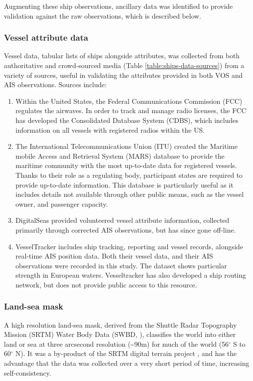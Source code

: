 \documentclass[12pt,letterpaper]{article}
\begin{document}
Augmenting these ship observations, ancillary data was identified to provide validation against the raw observations, which is described below.

\subsubsection{Vessel attribute data}
Vessel data, tabular lists of ships alongside attributes, was collected from both authoritative and crowd-sourced media (Table \ref{table:ships-data-sources}) from a variety of sources, useful in validating the attributes provided in both VOS and AIS observations. Sources include:
\begin{enumerate}
  \item Within the United States, the Federal Communications Commission (FCC) regulates the airwaves. In order to track and manage radio licenses, the FCC has developed the Consolidated Database System (CDBS), which includes information on all vessels with registered radios within the US. 
  \item The International Telecommunications Union (ITU) created the Maritime mobile Access and Retrieval System (MARS) database to provide the maritime community with the most up-to-date data for registered vessels. Thanks to their role as a regulating body, participant states are required to provide up-to-date information. This database is particularly useful as it includes details not available through other public means, such as the vessel owner, and passenger capacity.
  \item DigitalSeas provided volunteered vessel attribute information, collected primarily through corrected AIS observations, but has since gone off-line.
  \item VesselTracker includes ship tracking, reporting and vessel records, alongside real-time AIS position data. Both their vessel data, and their AIS observations were recorded in this study. The dataset shows particular strength in European waters. Vesseltracker has also developed a ship routing network, but does not provide public access to this resource.
\end{enumerate}

\subsubsection{Land-sea mask}
\label{sec:land-sea-mask}
  A high resolution land-sea mask, derived from the Shuttle Radar Topography Mission (SRTM) Water Body Data (SWBD, \citealp{slater2006srtm}), classifies the world into either land or sea at three arcsecond resolution (\textasciitilde{}90m) for much of the world (56$^\circ$ S to 60$^\circ$ N). It was a by-product of the SRTM digital terrain project \citep{rabus2003shuttle}, and has the advantage that the data was collected over a very short period of time, increasing self-consistency.
\end{document}
